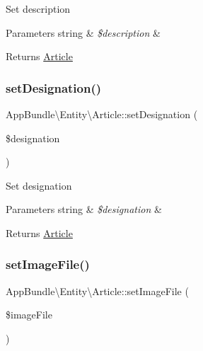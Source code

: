 Set description


\begin{DoxyParams}[1]{Parameters}
string & {\em \$description} & \\
\hline
\end{DoxyParams}
\begin{DoxyReturn}{Returns}
\hyperlink{class_app_bundle_1_1_entity_1_1_article}{Article} 
\end{DoxyReturn}
\mbox{\label{class_app_bundle_1_1_entity_1_1_article_a514464b95462c2c45d39a856529f5627}} 
\subsubsection{\texorpdfstring{set\+Designation()}{setDesignation()}}
{\footnotesize\ttfamily App\+Bundle\textbackslash{}\+Entity\textbackslash{}\+Article\+::set\+Designation (\begin{DoxyParamCaption}\item[{}]{\$designation }\end{DoxyParamCaption})}

Set designation


\begin{DoxyParams}[1]{Parameters}
string & {\em \$designation} & \\
\hline
\end{DoxyParams}
\begin{DoxyReturn}{Returns}
\hyperlink{class_app_bundle_1_1_entity_1_1_article}{Article} 
\end{DoxyReturn}
\mbox{\label{class_app_bundle_1_1_entity_1_1_article_a6368e998b98c7f9b274539a89ebf7c7e}} 
\subsubsection{\texorpdfstring{set\+Image\+File()}{setImageFile()}}
{\footnotesize\ttfamily App\+Bundle\textbackslash{}\+Entity\textbackslash{}\+Article\+::set\+Image\+File (\begin{DoxyParamCaption}\item[{}]{\$image\+File }\end{DoxyParamCaption})}


